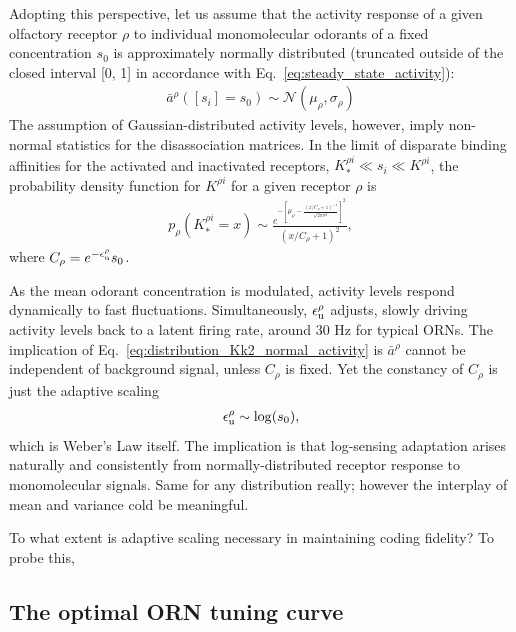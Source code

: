 \documentclass[9pt,twocolumn,twoside]{pnas-new}
\begin{document}
Adopting this perspective, let us assume that the activity response of a given olfactory receptor $\rho$ to individual monomolecular odorants of a fixed concentration $s_0$ is approximately normally distributed (truncated outside of the closed interval [0, 1] in accordance with Eq.~\ref{eq:steady_state_activity}):
\begin{align}
\bar a^\rho([s_i] = s_0) \sim \mathcal N(\mu_\rho, \sigma_\rho)
\label{eq:monomolecular_activity_levels}
\end{align} 
The assumption of Gaussian-distributed activity levels, however, imply non-normal statistics for the disassociation matrices. In the limit of disparate binding affinities for the activated and inactivated receptors, $K^{\rho i}_* \ll s_i \ll K^{\rho i}$, the probability density function for $K^{\rho i}$ for a given receptor $\rho$ is
\begin{align}
p_\rho(K_*^{\rho i} = x)  \sim \frac{e^{-\left[\mu_\rho - \frac{(x/C_\rho + 1)^{-1}}{\sqrt{2\pi \sigma^2}}\right]^2}}{(x/C_\rho + 1)^2}, 
\label{eq:distribution_Kk2_normal_activity}
\end{align}
where $C_\rho = e^{-\epsilon_{\text u}^\rho}s_0$. 

As the mean odorant concentration is modulated, activity levels respond dynamically to fast fluctuations. Simultaneously, $\epsilon_{\text u}^\rho$ adjusts, slowly driving activity levels back to a latent firing rate, around 30 Hz for typical ORNs. The implication of Eq.~\ref{eq:distribution_Kk2_normal_activity} is $\bar a^\rho$ cannot be independent of background signal, unless $C_\rho$ is fixed. Yet the constancy of $C_\rho$ is just the adaptive scaling
\begin{align}
\epsilon_{\text u}^\rho \sim \log(s_0),
\end{align}
which is Weber's Law itself. The implication is that log-sensing adaptation arises naturally and consistently from normally-distributed receptor response to monomolecular signals. {\color {blue} Same for any distribution really; however the interplay of mean and variance cold be meaningful.}

To what extent is adaptive scaling necessary in maintaining coding fidelity? To probe this, 

\subsection*{The optimal ORN tuning curve}
\end{document}
